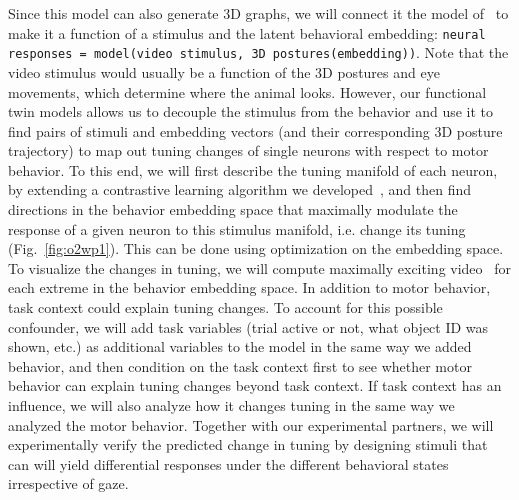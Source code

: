 \documentclass[B2,COG]{ercgrant}
\begin{document}
Since this model can also generate 3D graphs, we will connect it the model of~ to make it a function of a stimulus and the latent behavioral embedding: \texttt{neural responses = model(video stimulus, 3D postures(embedding))}.
Note that the video stimulus would usually be a function of the 3D postures and eye movements, which determine where the animal looks. 
However, our functional twin models allows us to decouple the stimulus from the behavior and use it to find pairs of stimuli and embedding vectors (and their corresponding 3D posture trajectory) to map out tuning changes of single neurons with respect to motor behavior. 
To this end, we will first describe the tuning manifold of each neuron, by extending a contrastive learning algorithm we developed~\parencite{Baroni2022-fi}, and then find directions in the behavior embedding space that maximally modulate the response of a given neuron to this stimulus manifold, i.e. change its tuning (Fig.~\ref{fig:o2wp1}).
This can be done using optimization on the embedding space. 
To visualize the changes in tuning, we will compute maximally exciting video~\parencite{Walker2019-yw} for each extreme in the behavior embedding space. 
In addition to motor behavior, task context could explain tuning changes. 
To account for this possible confounder, we will add task variables (trial active or not, what object ID was shown, etc.) as additional variables to the model in the same way we added behavior, and then condition on the task context first to see whether motor behavior can explain tuning changes beyond task context. 
If task context has an influence, we will also analyze how it changes tuning in the same way we analyzed the motor behavior. 
Together with our experimental partners, we will experimentally verify the predicted change in tuning by designing stimuli that can will yield differential responses under the different behavioral states irrespective of gaze. 
\end{document}
